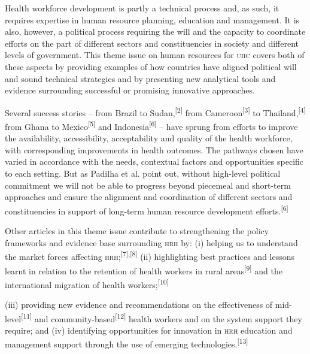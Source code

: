 \documentclass{article}
\begin{document}
Health workforce development is partly a technical process and, as such, it
requires expertise in
human resource planning, education and management. It is also, however, a
political process
requiring the will and the capacity to coordinate efforts on the part of
different sectors and
constituencies in society and different levels of government. This theme issue
on human resources
for \textsc{uhc} covers both of these aspects by providing examples of how countries have
aligned political
will and sound technical strategies and by presenting new analytical tools and
evidence surrounding
successful or promising innovative approaches.

Several success stories – from Brazil to
Sudan,\textsuperscript{[}\textsuperscript{2}\textsuperscript{]}
from Cameroon\textsuperscript{[}\textsuperscript{3}\textsuperscript{]}
to
Thailand,\textsuperscript{[}\textsuperscript{4}\textsuperscript{]}
from Ghana to Mexico\textsuperscript{[}\textsuperscript{5}\textsuperscript{]}
and Indonesia\textsuperscript{[}\textsuperscript{6}\textsuperscript{]}
– have sprung from efforts to improve the availability, accessibility,
acceptability and quality of the health workforce, with corresponding
improvements in health
outcomes. The pathways chosen have varied in accordance with the needs,
contextual factors and
opportunities specific to each setting. But as Padilha et al. point out, without
high-level
political commitment we will not be able to progress beyond piecemeal and
short-term approaches and
ensure the alignment and coordination of different sectors and constituencies in
support of
long-term human resource development
efforts.\textsuperscript{[}\textsuperscript{6}\textsuperscript{]}

Other articles in this theme issue contribute to strengthening the policy
frameworks and evidence
base surrounding \textsc{hrh} by: (i) helping us to understand the market forces
affecting \textsc{hrh};\textsuperscript{[}\textsuperscript{7}\textsuperscript{]}\textsuperscript{,}\textsuperscript{[}\textsuperscript{8}\textsuperscript{]}
(ii) highlighting best practices and lessons learnt in relation to the
retention of health workers in rural areas\textsuperscript{[}\textsuperscript{9}\textsuperscript{]}
and the
international migration of health
workers;\textsuperscript{[}\textsuperscript{10}\textsuperscript{]}

(iii) providing new evidence and recommendations on the effectiveness of
mid-level\textsuperscript{[}\textsuperscript{11}\textsuperscript{]}
and community-based\textsuperscript{[}\textsuperscript{12}\textsuperscript{]}
health workers and on the system support they require; and
(iv) identifying opportunities for innovation in \textsc{hrh} education and management
support through
the use of emerging technologies.\textsuperscript{[}\textsuperscript{13}\textsuperscript{]}
\end{document}
